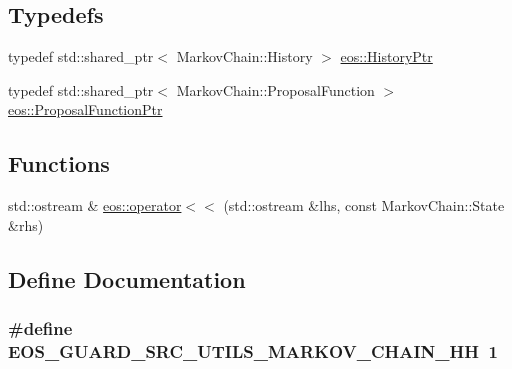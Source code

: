 \subsection*{Typedefs}
\begin{DoxyCompactItemize}
\item 
typedef std::shared\_\-ptr$<$ MarkovChain::History $>$ \hyperlink{namespaceeos_ac9f30fde04446cfabdd69d4b5b5d3c5a}{eos::HistoryPtr}
\item 
typedef std::shared\_\-ptr$<$ MarkovChain::ProposalFunction $>$ \hyperlink{namespaceeos_ae97f9891c67c90959a03fc96efaa4dc9}{eos::ProposalFunctionPtr}
\end{DoxyCompactItemize}
\subsection*{Functions}
\begin{DoxyCompactItemize}
\item 
std::ostream \& \hyperlink{namespaceeos_a71b35e367b59b8fe16e6111d0851445f}{eos::operator$<$$<$} (std::ostream \&lhs, const MarkovChain::State \&rhs)
\end{DoxyCompactItemize}


\subsection{Define Documentation}
\hypertarget{markov__chain_8hh_ae0ec1ee591df5ff97e6f782528436afc}{
\subsubsection[{EOS\_\-GUARD\_\-SRC\_\-UTILS\_\-MARKOV\_\-CHAIN\_\-HH}]{\setlength{\rightskip}{0pt plus 5cm}\#define EOS\_\-GUARD\_\-SRC\_\-UTILS\_\-MARKOV\_\-CHAIN\_\-HH~1}}
\label{markov__chain_8hh_ae0ec1ee591df5ff97e6f782528436afc}
